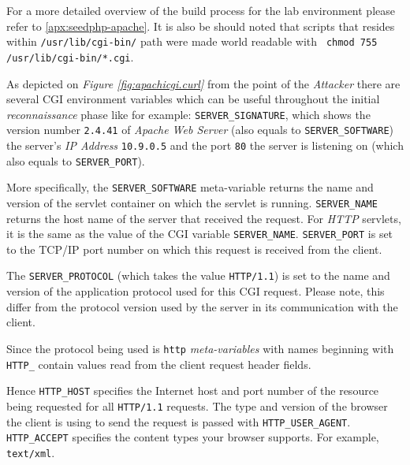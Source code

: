\documentclass[12pt,a4paper,twocolumn]{article}
\begin{document}
For a more detailed overview of the build process for the lab environment please refer to \ref{apx:seedphp-apache}. It is also be should noted that scripts that resides within \lstinline{/usr/lib/cgi-bin/} path were made world readable with \lstinline{ chmod 755 /usr/lib/cgi-bin/*.cgi}\cite{bin.chmod}.

As depicted on \textit{Figure \ref{fig:apachicgi.curl}} from  the point of the \textit{Attacker} there are several CGI environment variables\cite{envvar.cgi} which can be useful throughout the initial \textit{reconnaissance}\cite{attck.recon} phase like for example: \lstinline{SERVER_SIGNATURE}, which shows the version number \lstinline{2.4.41} of \textit{Apache Web Server} (also equals to \lstinline{SERVER_SOFTWARE}\cite{envvar.cgi.server-software}) the server's \textit{IP Address}\cite{ipv4proto} \lstinline{10.9.0.5} and the port \lstinline{80} the server is listening on (which also equals to \lstinline{SERVER_PORT}\cite{envvar.cgi.server-port}).

More specifically, the \lstinline{SERVER_SOFTWARE}\cite{envvar.cgi.server-software} meta-variable returns the name and version of the servlet container on which the servlet is running. \lstinline{SERVER_NAME}\cite{envvar.cgi.server-name} returns the host name of the server that received the request. For \textit{HTTP} servlets, it is the same as the value of the CGI variable \lstinline{SERVER_NAME}. \lstinline{SERVER_PORT}\cite{envvar.cgi.server-port} is set to the TCP/IP port number on    which this request is received from the client. 

The \lstinline{SERVER_PROTOCOL}\cite{envvar.cgi.server-protocol} (which takes the value \lstinline{HTTP/1.1}\cite{ip.http.standard}) is set to the name and version of
the application protocol used for this CGI request.  Please note, this differ
from the protocol version used by the server in its communication with the client. \cite{envvar.cgi.server-protocol}
 

Since the protocol being used is \lstinline{http} \textit{meta-variables} with names beginning with \lstinline{HTTP_} contain values read from the client request header fields. \cite{ip.http.standard, ip.http.methods.} 

Hence  \lstinline{HTTP_HOST}\cite{envvar.cgi.http-host} specifies the Internet host and port number of the resource being requested for all \lstinline{HTTP/1.1} requests. The type and version of the browser the client is using to send the request is passed with \lstinline{HTTP_USER_AGENT}\cite{envvar.cgi.http-user-agent}. \lstinline{HTTP_ACCEPT}\cite{envvar.cgi.http-accept} specifies the content types your browser supports. For example, \lstinline{text/xml}.  
\end{document}
